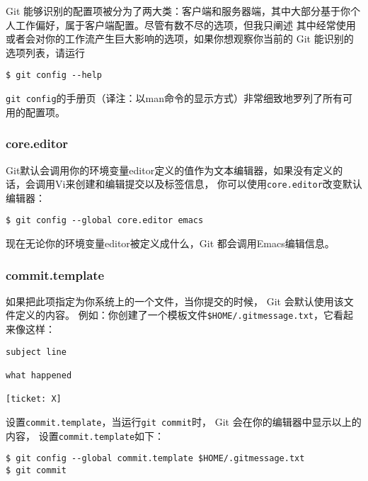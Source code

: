 \documentclass[a4paper]{book}
\begin{document}
Git 能够识别的配置项被分为了两大类：客户端和服务器端，其中大部分基于你个人工作偏好，属于客户端配置。尽管有数不尽的选项，但我只阐述 其中经常使用或者会对你的工作流产生巨大影响的选项，如果你想观察你当前的 Git 能识别的选项列表，请运行

\begin{shaded}\begin{verbatim}
$ git config --help
\end{verbatim}\end{shaded}

\texttt{git config}的手册页（译注：以man命令的显示方式）非常细致地罗列了所有可用的配置项。

\subsubsection{core.editor}

Git默认会调用你的环境变量editor定义的值作为文本编辑器，如果没有定义的话，会调用Vi来创建和编辑提交以及标签信息， 你可以使用\texttt{core.editor}改变默认编辑器：

\begin{shaded}\begin{verbatim}
$ git config --global core.editor emacs
\end{verbatim}\end{shaded}

现在无论你的环境变量editor被定义成什么，Git 都会调用Emacs编辑信息。

\subsubsection{commit.template}

如果把此项指定为你系统上的一个文件，当你提交的时候， Git 会默认使用该文件定义的内容。 例如：你创建了一个模板文件\texttt{\$HOME/.gitmessage.txt}，它看起来像这样：

\begin{shaded}\begin{verbatim}
subject line

what happened

[ticket: X]
\end{verbatim}\end{shaded}

设置\texttt{commit.template}，当运行\texttt{git commit}时， Git 会在你的编辑器中显示以上的内容， 设置\texttt{commit.template}如下：

\begin{shaded}\begin{verbatim}
$ git config --global commit.template $HOME/.gitmessage.txt
$ git commit
\end{verbatim}\end{shaded}
\end{document}
